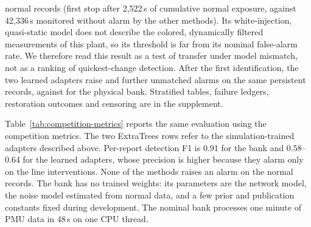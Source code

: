 normal records (first stop after 2{,}522\,s of cumulative normal exposure,
against 42{,}336\,s monitored without alarm by the other methods). Its
white-injection, quasi-static model does not describe the colored,
dynamically filtered measurements of this plant, so its threshold is far
from its nominal false-alarm rate. We therefore read this result as a test
of transfer under model mismatch, not as a ranking of quickest-change
detection. After the first identification, the two learned adapters raise
\PersistETExtras{} and \PersistShortExtras{} further unmatched alarms on the
same persistent records, against \PersistPhysicalExtras{} for the
physical bank. Stratified tables, failure ledgers, restoration outcomes and
censoring are in the supplement.

Table~\ref{tab:competition-metrics} reports the same evaluation using the
competition metrics. The two ExtraTrees rows refer to the simulation-trained
adapters described above. Per-report detection F1 is 0.91 for
the bank and 0.58--0.64 for the learned adapters, whose precision is higher
because they alarm only on the line interventions. None of the methods
raises an alarm on the normal records. The bank has no trained weights:
its parameters are the network model, the noise model estimated from normal
data, and a few prior and publication constants fixed during
development. The nominal bank processes one
minute of PMU data in 48\,s on one CPU thread.

